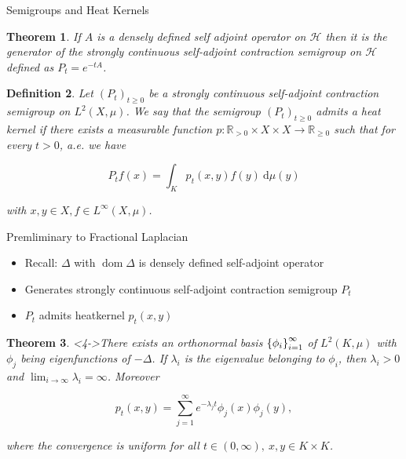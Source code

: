 \documentclass{beamer}
\newcounter{chapCount}
\newtheorem{theorems}{Theorem}[chapCount]
\newtheorem{defi}[theorems]{Definition}
\newcommand{\ree}{\mathbb{R}}
\DeclareMathOperator{\dom}{dom}
\newcommand{\dd}{\ \text{d}}
\begin{document}
	
	\begin{frame}{Semigroups and Heat Kernels}
		
		\vspace{3.5em}
		\setcounter{theorems}{24}
		\begin{theorems}
			If $A$ is a densely defined self adjoint operator on $\mathcal{H}$ then it is the generator of the strongly continuous self-adjoint contraction semigroup on $\mathcal{H}$ defined as $P_t = e^{-tA}$.
		\end{theorems}
		\pause
	\setcounter{theorems}{26}
	\begin{defi}\label{heatKernel}
		Let $(P_t)_{t \geq 0}$ be a strongly continuous self-adjoint contraction semigroup on $L^2(X, \mu)$. We say that the semigroup $(P_t)_{t \geq 0}$ \emph{admits a heat kernel} if there exists a measurable function $p\colon \ree_{> 0} \times X \times X \to \ree_{\geq 0}$ such that for every $t > 0$, a.e. we have
		
		\vspace{-0.5em}
		\begin{equation}
			P_tf(x) = \int_{K}p_t(x,y)f(y) \dd \mu(y)
		\end{equation}
		
	\vspace{-0.5em}
		with $x,y \in X, f \in L^{\infty}(X, \mu)$.
	\end{defi}
	\end{frame}
	
	\begin{frame}{Premliminary to Fractional Laplacian}
		
		\vspace{3.5em}
		\begin{itemize}
			\item<1-> Recall: $\Delta$ with $\dom \Delta$ is densely defined self-adjoint operator
			\item<2-> Generates strongly continuous self-adjoint contraction semigroup $P_t$
			\item<3-> $P_t$ admits heatkernel $p_t(x,y)$
		\end{itemize}
		
		\setcounter{theorems}{28}
		\begin{theorems}<4->\label{heatKernelWritten}
			There exists an orthonormal basis $\cbr{\phi_{i}}^{\infty}_{i = 1}$ of $L^2(K, \mu)$ with $\phi_j$ being eigenfunctions of $-\Delta$. If $\lambda_i$ is the eigenvalue belonging to $\phi_i$, then $\lambda_i >0$ and $\lim_{i \to \infty} \lambda_i = \infty$. Moreover
			
			\vspace{-0.5em}
			\begin{equation}
				p_t(x,y) = \sum_{j = 1}^{\infty} e^{-\lambda_j t} \phi_j(x)\phi_j(y),
			\end{equation}
			
			\vspace{-0.5em}
			where the convergence is uniform for all $t \in (0, \infty), \ x,y \in K \times K$.
		\end{theorems}
	\end{frame}
	
\end{document}
